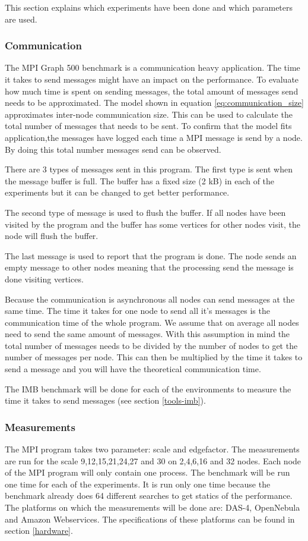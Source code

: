 This section explains which experiments have been done and which parameters are used.

\subsubsection{Communication}
\label{med:comm}
The MPI Graph 500 benchmark is a communication heavy application. The time it takes to send messages might have an impact on the performance. To evaluate how much time is spent on sending messages, the total amount of messages send needs to be approximated. The model shown in equation \ref{eq:communication_size} approximates inter-node communication size. This can be used to calculate the total number of messages that needs to be sent. To confirm that the model fits application,the messages have logged each time a MPI message is send by a node. By doing this total number messages send can be observed. 

There are 3 types of messages sent in this program. The first type is sent when the message buffer is full. The buffer has a fixed size (2 kB) in each of the experiments but it can be changed to get better performance. 

The second type of message is used to flush the buffer. If all nodes have been visited by the program and the buffer has some vertices for other nodes visit, the node will flush the buffer.

The last message is used to report that the program is done. The node sends an empty message to other nodes meaning that the processing send the message is done visiting vertices.

Because the communication is asynchronous all nodes can send messages at the same time. The time it takes for one node to send all it's messages is the communication time of the whole program. We assume that on average all nodes need to send the same amount of messages. With this assumption in mind the total number of messages needs to be divided by the number of nodes to get the number of messages per node. This can then be multiplied by the time it takes to send a message and you will have the theoretical communication time.  

The IMB benchmark will be done for each of the environments to measure the time it takes to send messages (see section \ref{tools-imb}).


\subsubsection{Measurements}
The MPI program takes two parameter: scale and edgefactor. The measurements are run for the scale 9,12,15,21,24,27 and 30 on 2,4,6,16 and 32 nodes. Each node of the MPI program will only contain one process. The benchmark will be run one time for each of the experiments. It is run only one time because the benchmark already does 64 different searches to get statics of the performance. The platforms on which the measurements will be done are: DAS-4, OpenNebula and Amazon Webservices. The specifications of these platforms can be found in section \ref{hardware}.

